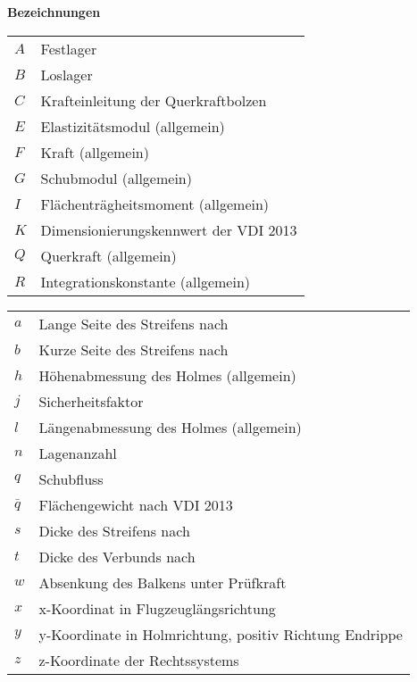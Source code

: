 \textbf{Bezeichnungen}
\begin{table}[h]

\begin{tabular}{ll}
	$ A $&Festlager\\
	$ B $&Loslager\\
	$ C $&Krafteinleitung der Querkraftbolzen\\
	$ E $&Elastizitätsmodul (allgemein)\\
	$ F $&Kraft (allgemein)\\
	$ G $&Schubmodul (allgemein)\\
	$ I $&Flächenträgheitsmoment (allgemein)\\
	$ K $&Dimensionierungskennwert der VDI 2013\\
	$ Q $&Querkraft (allgemein)\\
	$ R $&Integrationskonstante (allgemein)\\
	
\end{tabular}
\end{table}

\begin{table}[h]
	\begin{tabular}{ll}
		$ a $&Lange Seite des Streifens nach \cite{item1}\\
		$ b $&Kurze Seite des Streifens nach \cite{item1}\\
		$ h $&Höhenabmessung des Holmes (allgemein)\\
		$ j $&Sicherheitsfaktor\\
		$ l $&Längenabmessung des Holmes (allgemein)\\
		$ n $&Lagenanzahl\\
		$ q $&Schubfluss\\
		$ \bar{q} $&Flächengewicht nach VDI 2013\\
		$ s $&Dicke des Streifens nach \cite{item1}\\
		$ t $&Dicke des Verbunds nach \cite{item3}\\
		$ w $&Absenkung des Balkens unter Prüfkraft\\
		$ x $&x-Koordinat in Flugzeuglängsrichtung\\
		$ y $&y-Koordinate in Holmrichtung, positiv Richtung Endrippe\\
		$ z $&z-Koordinate der Rechtssystems\\
		
	\end{tabular}
\end{table}

